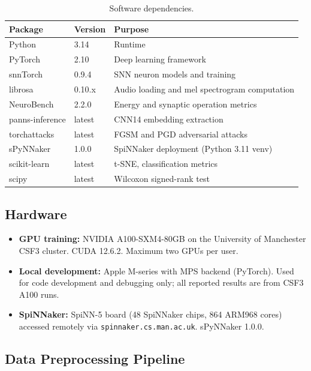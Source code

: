 \begin{table}[H]
\centering
\caption{Software dependencies.}
\label{tab:software}
\small
\begin{tabular}{lll}
\toprule
\textbf{Package} & \textbf{Version} & \textbf{Purpose} \\
\midrule
Python           & 3.14             & Runtime \\
PyTorch          & 2.10             & Deep learning framework \\
snnTorch         & 0.9.4            & SNN neuron models and training \\
librosa          & 0.10.x           & Audio loading and mel spectrogram computation \\
NeuroBench       & 2.2.0            & Energy and synaptic operation metrics \\
panns-inference  & latest           & CNN14 embedding extraction \\
torchattacks     & latest           & FGSM and PGD adversarial attacks \\
sPyNNaker        & 1.0.0            & SpiNNaker deployment (Python 3.11 venv) \\
scikit-learn     & latest           & t-SNE, classification metrics \\
scipy            & latest           & Wilcoxon signed-rank test \\
\bottomrule
\end{tabular}
\end{table}

\subsection{Hardware}

\begin{itemize}[nosep]
    \item \textbf{GPU training:} NVIDIA A100-SXM4-80GB on the University of Manchester CSF3 cluster. CUDA 12.6.2. Maximum two GPUs per user.
    \item \textbf{Local development:} Apple M-series with MPS backend (PyTorch). Used for code development and debugging only; all reported results are from CSF3 A100 runs.
    \item \textbf{SpiNNaker:} SpiNN-5 board (48 SpiNNaker chips, 864 ARM968 cores) accessed remotely via \texttt{spinnaker.cs.man.ac.uk}. sPyNNaker 1.0.0.
\end{itemize}

\subsection{Data Preprocessing Pipeline}


